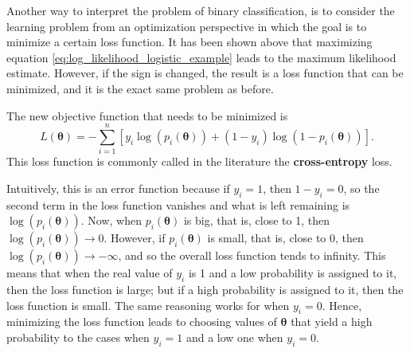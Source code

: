 Another way to interpret the problem of binary classification, is to consider the learning problem from an optimization perspective in which the goal is to minimize a certain loss function. It has been shown above that maximizing equation \eqref{eq:log_likelihood_logistic_example} leads to the maximum likelihood estimate. However, if the sign is changed, the result is a loss function that can be minimized, and it is the exact same problem as before.

The new objective function that needs to be minimized is
\begin{equation}
  \label{eq:logistic_example_loss_function}
  L(\boldsymbol{\theta}) = - \sum_{i = 1}^n \left[ y_i \log\left( p_i(\boldsymbol{\theta}) \right) + (1 - y_i) \log \left( 1 - p_i(\boldsymbol{\theta}) \right) \right].
\end{equation}
This loss function is commonly called in the literature the \textbf{cross-entropy} loss.

Intuitively, this is an error function because if $y_i = 1$, then $1 - y_i = 0$, so the second term in the loss function vanishes and what is left remaining is $\log\left( p_i(\boldsymbol{\theta}) \right)$. Now, when $p_i(\boldsymbol{\theta})$ is big, that is, close to 1, then $\log\left( p_i(\boldsymbol{\theta}) \right) \to 0$. However, if $p_i(\boldsymbol{\theta})$ is small, that is, close to 0, then $\log\left( p_i(\boldsymbol{\theta}) \right) \to -\infty$, and so the overall loss function tends to infinity. This means that when the real value of $y_i$ is 1 and a low probability is assigned to it, then the loss function is large; but if a high probability is assigned to it, then the loss function is small. The same reasoning works for when $y_i = 0$.
Hence, minimizing the loss function leads to choosing values of $\boldsymbol{\theta}$ that yield a high probability to the cases when $y_i = 1$ and a low one when $y_i = 0$.


